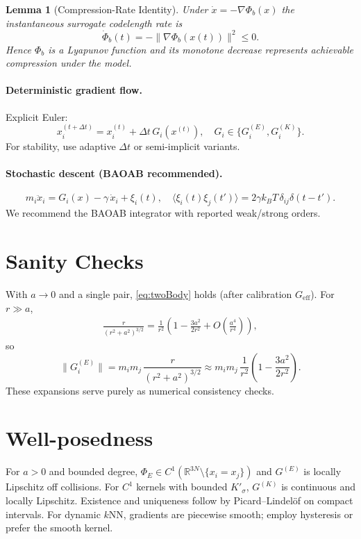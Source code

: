 \documentclass[11pt,a4paper]{article}
\numberwithin{equation}{section}
\newtheorem{lemma}{Lemma}[section]
\newcommand{\R}{\mathbb{R}}
\begin{document}
\begin{lemma}[Compression-Rate Identity]
\label{lem:compression-rate}
Under $\dot x=-\nabla\Phi_b(x)$ the instantaneous surrogate codelength rate is 
\begin{equation}
\dot \Phi_b(t)=-\|\nabla\Phi_b(x(t))\|^2\le0.
\end{equation}
Hence $\Phi_b$ is a Lyapunov function and its monotone decrease represents achievable compression under the model.
\end{lemma}

\paragraph{Deterministic gradient flow.}
Explicit Euler:
\begin{equation}
x_i^{(t+\Delta t)} = x_i^{(t)} + \Delta t\,G_i(x^{(t)}),\quad 
G_i\in\{G^{(E)}_i,G^{(K)}_i\}.
\end{equation}
For stability, use adaptive $\Delta t$ or semi-implicit variants.

\paragraph{Stochastic descent (BAOAB recommended).}
\begin{equation}
m_i\ddot{x}_i = G_i(x)-\gamma\,\dot{x}_i + \xi_i(t),\quad
\langle \xi_i(t)\xi_j(t')\rangle=2\gamma k_B T\,\delta_{ij}\delta(t-t').
\end{equation}
We recommend the BAOAB integrator with reported weak/strong orders.

\section{Sanity Checks}
With $a\to 0$ and a single pair, \eqref{eq:twoBody} holds (after calibration $G_{\text{eff}}$).  
For $r\gg a$,
\begin{align}
\frac{r}{(r^2+a^2)^{3/2}}
= \frac{1}{r^2}\left(1-\frac{3a^2}{2r^2}+O\!\left(\frac{a^4}{r^4}\right)\right),
\end{align}
so
\begin{equation}
\big\lVert G^{(E)}_i\big\rVert
= m_im_j\,\frac{r}{(r^2+a^2)^{3/2}}
\approx m_im_j\,\frac{1}{r^2}\left(1-\frac{3a^2}{2r^2}\right).
\end{equation}
These expansions serve purely as numerical consistency checks.

\section{Well-posedness}
For $a>0$ and bounded degree, $\Phi_E\in C^1(\R^{3N}\setminus\{x_i=x_j\})$ and $G^{(E)}$ is locally Lipschitz off collisions. For $C^1$ kernels with bounded $K'_\sigma$, $G^{(K)}$ is continuous and locally Lipschitz. Existence and uniqueness follow by Picard--Lindelöf on compact intervals. For dynamic $k$NN, gradients are piecewise smooth; employ hysteresis or prefer the smooth kernel.
\end{document}

